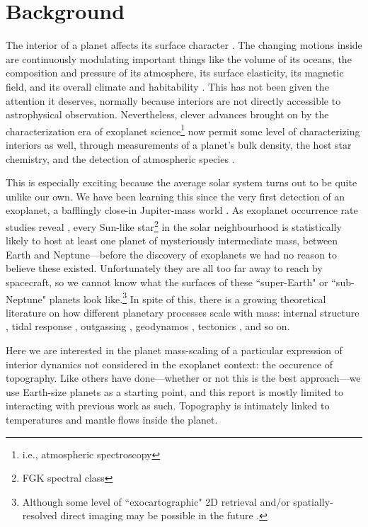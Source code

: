 \section{Background}

The interior of a planet affects its surface character \citep{Kereszturi2016, Meadows2018, Shahar2019, Dehant2019}. The changing motions inside are continuously modulating important things like the volume of its oceans, the composition and pressure of its atmosphere, its surface elasticity, its magnetic field, and its overall climate and habitability \citep{Noack2014, Foley2016, Wordsworth2016, Tosi2017, Wordsworth2018}. This has not been given the attention it deserves, normally because interiors are not directly accessible to astrophysical observation. Nevertheless, clever advances brought on by the characterization era of exoplanet science\footnote{i.e., atmospheric spectroscopy} now permit some level of characterizing interiors as well, through measurements of a planet's bulk density, the host star chemistry, and the detection of atmospheric species \citep{Santos2017, Dorn2017, Dorn2017a, Dorn2018, Bower2019, Madhusudhan2020}. 

This is especially exciting because the average solar system turns out to be quite unlike our own. We have been learning this since the very first detection of an exoplanet, a bafflingly close-in Jupiter-mass world \citep{Mayor1995}. As exoplanet occurrence rate studies reveal \citep{Kunimoto2020}, every Sun-like star\footnote{FGK spectral class} in the solar neighbourhood is statistically likely to host at least one planet of mysteriously intermediate mass, between Earth and Neptune---before the discovery of exoplanets we had no reason to believe these existed. Unfortunately they are all too far away to reach by spacecraft, so we cannot know what the surfaces of these ``super-Earth" or ``sub-Neptune" planets look like.\footnote{Although some level of ``exocartographic" 2D retrieval and/or spatially-resolved direct imaging may be possible in the future \citep{Farr2018, Madurowicz2020a}.} In spite of this, there is a growing theoretical literature on how different planetary processes scale with mass: internal structure \citep{Valencia2006, Zeng2017}, tidal response \citep{Tobie2019}, outgassing \citep{Kite2009, Noack2017, Dorn2018a}, geodynamos \citep{Gaidos2010}, tectonics \citep{ONeill2007, Korenaga2010}, and so on. 

Here we are interested in the planet mass-scaling of a particular expression of interior dynamics not considered in the exoplanet context: the occurence of topography. Like others have done---whether or not this is the best approach---we use Earth-size planets as a starting point, and this report is mostly limited to interacting with previous work as such. Topography is intimately linked to temperatures and mantle flows inside the planet.

